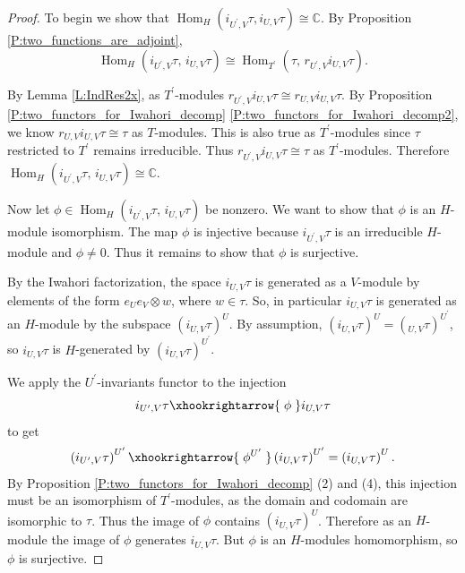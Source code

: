 \documentclass[10pt, letterpaper]{amsart}
\theoremstyle{plain}
\theoremstyle{definition}
\numberwithin{equation}{section}
\newcommand{\Hom}{\operatorname{Hom}}
\begin{document}
\begin{proof}
	To begin we show that $\Hom_{H}(i_{U^{\prime},V}\tau,i_{U,V}\tau)\cong \mathbb{C}$. By Proposition \ref{P:two_functions_are_adjoint},
	\begin{equation*}
		\Hom_{H}(i_{U^{\prime},V}\tau,\, i_{U,V}\tau)\cong \Hom_{T^{\prime}}(\tau,\, r_{U^{\prime},V}i_{U,V}\tau).
	\end{equation*}
	
	By Lemma \ref{L:IndRes2x}, as $T^{\prime}$-modules $r_{U^{\prime},V}i_{U,V}\tau\cong r_{U,V}i_{U,V}\tau$. By Proposition \ref{P:two_functors_for_Iwahori_decomp} \eqref{P:two_functors_for_Iwahori_decomp2}, we know $r_{U,V}i_{U,V}\tau\cong \tau$ as $T$-modules. This is also true as $T^{\prime}$-modules since $\tau$ restricted to $T^{\prime}$ remains irreducible. Thus $r_{U^{\prime},V}i_{U,V}\tau\cong \tau$ as $T^{\prime}$-modules. Therefore $\Hom_{H}(i_{U^{\prime},V}\tau,\, i_{U,V}\tau)\cong \mathbb{C}$.
	
	Now let $\phi\in \Hom_{H}(i_{U^{\prime},V}\tau,\, i_{U,V}\tau)$ be nonzero. We want to show that $\phi$ is an $H$-module isomorphism. The map $\phi$ is injective because $i_{U^{\prime},V}\tau$ is an irreducible $H$-module and $\phi\neq 0$. Thus it remains to show that $\phi$ is surjective.
	
	By the Iwahori factorization, the space $i_{U,V}\tau$ is generated as a $V$-module by elements of the form $e_{U}e_{V}\otimes w$, where $w\in \tau$. So, in particular $i_{U,V}\tau$ is generated as an $H$-module by the subspace $(i_{U,V}\tau)^{U}$. By assumption, $(i_{U,V}\tau)^{U}=(_{U,V}\tau)^{U^{\prime}}$, so $i_{U,V}\tau$ is $H$-generated by $(i_{U,V}\tau)^{U^{\prime}}$.
	
	We apply the $U^{\prime}$-invariants functor to the injection
	\begin{equation*}
		i_{U^{\prime},V}\tau \xhookrightarrow{\;\phi\;} i_{U,V}\tau
	\end{equation*}
	to get 
	\begin{equation*}
		\left(i_{U^{\prime},V}\tau\right)^{U^{\prime}}\xhookrightarrow{\;\phi^{U^{\prime}}\;} \left(i_{U,V}\tau\right)^{U^{\prime}}=\left(i_{U,V}\tau\right)^{U}.
	\end{equation*}
	By Proposition \ref{P:two_functors_for_Iwahori_decomp} (2) and (4), this injection must be an isomorphism of $T^{\prime}$-modules, as the domain and codomain are isomorphic to $\tau$. Thus the image of $\phi$ contains $\left(i_{U,V}\tau\right)^{U}$. Therefore as an $H$-module the image of $\phi$ generates $i_{U,V}\tau$. But $\phi$ is an $H$-modules homomorphism, so $\phi$ is surjective.
\end{proof}
\end{document}
